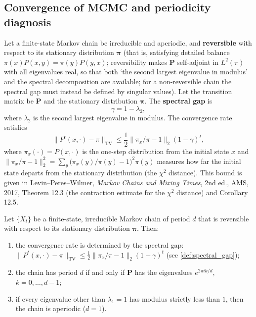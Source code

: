 \subsection{Convergence of MCMC and periodicity diagnosis}

\begin{definition}\label{def:spectral_gap}
Let a finite-state Markov chain be irreducible and aperiodic, and \textbf{reversible} with respect to its stationary distribution $\boldsymbol\pi$ (that is, satisfying detailed balance $\pi(x)P(x,y)=\pi(y)P(y,x)$; reversibility makes $\mathbf P$ self-adjoint in $L^2(\pi)$ with all eigenvalues real, so that both `the second largest eigenvalue in modulus' and the spectral decomposition are available; for a non-reversible chain the spectral gap must instead be defined by singular values). Let the transition matrix be $\mathbf P$ and the stationary distribution $\boldsymbol\pi$. The \textbf{spectral gap} is
\[
\gamma=1-\lambda_2,
\]
where $\lambda_2$ is the second largest eigenvalue in modulus. The convergence rate satisfies
\[
\|P^t(x,\cdot)-\pi\|_{\mathrm{TV}}\le \frac12\|\pi_x/\pi-1\|_2(1-\gamma)^t,
\]
where $\pi_x(\cdot)=P(x,\cdot)$ is the one-step distribution from the initial state $x$ and $\|\pi_x/\pi-1\|_2^2=\sum_y\bigl(\pi_x(y)/\pi(y)-1\bigr)^2\pi(y)$ measures how far the initial state departs from the stationary distribution (the $\chi^2$ distance). This bound is given in Levin--Peres--Wilmer, \textit{Markov Chains and Mixing Times}, 2nd ed., AMS, 2017, Theorem 12.3 (the contraction estimate for the $\chi^2$ distance) and Corollary 12.5.
\end{definition}

\begin{theorem}\label{thm:mcmc_convergence}
Let $\{X_t\}$ be a finite-state, irreducible Markov chain of period $d$ that is reversible with respect to its stationary distribution $\boldsymbol\pi$. Then:
\begin{enumerate}[label=(\roman*)]
    \item the convergence rate is determined by the spectral gap: $\|P^t(x,\cdot)-\pi\|_{\mathrm{TV}}\le\frac12\|\pi_x/\pi-1\|_2(1-\gamma)^t$ (see \cref{def:spectral_gap});
    \item the chain has period $d$ if and only if $\mathbf P$ has the eigenvalues $e^{2\pi ik/d}$, $k=0,\dots,d-1$;
    \item if every eigenvalue other than $\lambda_1=1$ has modulus strictly less than $1$, then the chain is aperiodic ($d=1$).
\end{enumerate}
\end{theorem}

